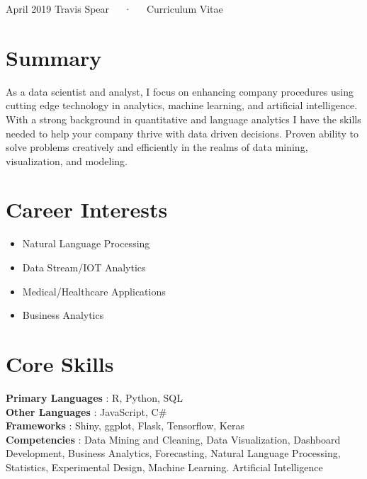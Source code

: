 \documentclass[11pt, a4paper]{awesome-cv}
\providecommand{\tightlist}{%
	\setlength{\itemsep}{0pt}\setlength{\parskip}{0pt}}
\begin{document}
\makecvheader

\makecvfooter
  {April 2019}
  {Travis Spear~~~·~~~Curriculum Vitae}
  {\thepage}





\hypertarget{summary}{%
\section{Summary}\label{summary}}

As a data scientist and analyst, I focus on enhancing company procedures using cutting edge technology in analytics, machine learning, and artificial intelligence. With a strong background in quantitative and language analytics I have the skills needed to help your company thrive with data driven decisions. Proven ability to solve problems creatively and efficiently in the realms of data mining, visualization, and modeling.

\hypertarget{career-interests}{%
\section{Career Interests}\label{career-interests}}

\begin{itemize}
\tightlist
\item
  Natural Language Processing
\item
  Data Stream/IOT Analytics
\item
  Medical/Healthcare Applications
\item
  Business Analytics
\end{itemize}

\hypertarget{core-skills}{%
\section{Core Skills}\label{core-skills}}

\textbf{Primary Languages} : R, Python, SQL\\
\textbf{Other Languages} : JavaScript, C\#\\
\textbf{Frameworks} : Shiny, ggplot, Flask, Tensorflow, Keras\\
\textbf{Competencies} : Data Mining and Cleaning, Data Visualization, Dashboard Development, Business Analytics, Forecasting, Natural Language Processing, Statistics, Experimental Design, Machine Learning. Artificial Intelligence
\end{document}
